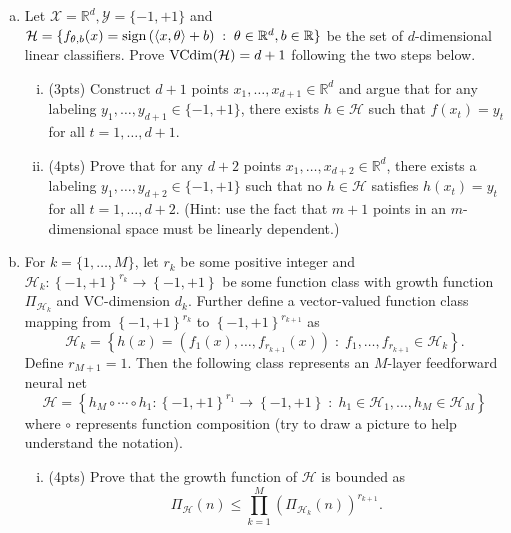 \documentclass[11pt]{article}
\newcommand{\calX}{{\mathcal{X}}}
\newcommand{\calY}{{\mathcal{Y}}}
\newcommand{\calH}{{\mathcal{H}}}
\newcommand{\VC}{{\text{\rm VCdim}}}
\newcommand{\blue}[1]{{\color{blue}#1}}
\newcommand{\R}{\mathbb{R}}
\newcommand{\cbr}[1]{\left\{#1\right\}}
\newcommand{\rbr}[1]{\left(#1\right)}
\newcommand{\inner}[2]{\left\langle #1,#2 \right\rangle}
\newcommand{\sign}{{\text{\rm sign}}}
\begin{document}
\begin{enumerate}[(a)]
\vspace{5pt}
\item 
Let $\calX = \R^d, \calY = \{-1,+1\} $ and $\calH = \{f_{\theta,b}(x) =  \sign\rbr{\inner{x}{\theta}+b} \;:\; \theta \in \R^d, b \in \R\}$ be the set of $d$-dimensional linear classifiers.
Prove $\VC(\calH) = d+1$ following the two steps below.

\begin{enumerate}[(i)]
\item (\blue{3pts}) 
Construct $d+1$ points $x_1, \ldots, x_{d+1} \in \R^d$ and argue that for any labeling $y_1, \ldots, y_{d+1} \in \{-1,+1\}$, there exists $h \in \calH$ such that $f(x_t) = y_t$ for all $t = 1, \ldots, d+1$. \\

\item (\blue{4pts}) 
Prove that for any $d+2$ points $x_1, \ldots, x_{d+2} \in \R^d$, there exists a labeling $y_1, \ldots, y_{d+2} \in \{-1,+1\}$ such that no $h\in\calH$ satisfies $h(x_t) = y_t$ for all $t = 1, \ldots, d+2$. 
(Hint: use the fact that $m+1$ points in an $m$-dimensional space must be linearly dependent.)\\

\end{enumerate}

\vspace{5pt}
\item For $k=\{1, \ldots, M\}$, let $r_k$ be some positive integer and $\calH_k: \cbr{-1,+1}^{r_k} \rightarrow \cbr{-1,+1}$ be some function class with growth function $\Pi_{\calH_k}$ and VC-dimension $d_k$.
Further define a vector-valued function class mapping from $\cbr{-1,+1}^{r_k}$ to $\cbr{-1,+1}^{r_{k+1}}$ as
\[
\calH_k = \cbr{h(x) = (f_1(x), \ldots, f_{r_{k+1}}(x)) \;:\; f_1, \ldots, f_{r_{k+1}} \in \calH_k}.
\]
Define $r_{M+1} = 1$.
Then the following class represents an $M$-layer feedforward neural net
\[
\calH = \cbr{h_M \circ \cdots \circ h_1 :  \cbr{-1,+1}^{r_1} \rightarrow \cbr{-1,+1}\;:\; h_1 \in \calH_1, \ldots, h_M \in \calH_M}
\]
where $\circ$ represents function composition (try to draw a picture to help understand  the notation).

\begin{enumerate}[(i)]
\item (\blue{4pts}) 
Prove that the growth function of $\calH$ is bounded as \[\Pi_\calH(n) \leq \prod_{k=1}^M \rbr{\Pi_{\calH_k}(n)}^{r_{k+1}}.\] 


\end{enumerate}
\end{enumerate}
\end{document}
